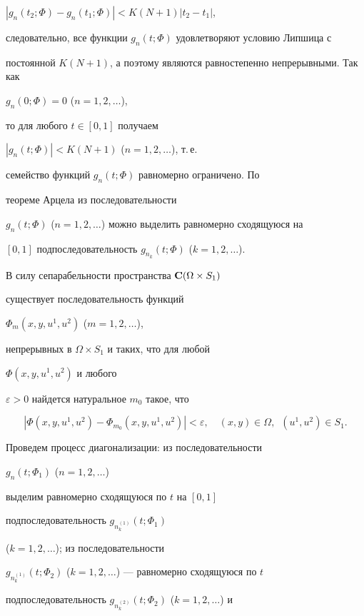 \begin{pf}
$|g_n(t_2;\Phi)-g_n(t_1;\Phi)|<K(N+1)|t_2-t_1|$,


следовательно, все функции $g_n(t;\Phi)$ удовлетворяют условию Липшица с


постоянной $K(N+1)$, а поэтому являются равностепенно непрерывными. Так как


$g_n(0;\Phi)=0$ ($n=1,2,\dotsc$),


то для любого $t\in[0,1]$ получаем


$|g_n(t;\Phi)|<K(N+1)$ ($n=1,2,\dotsc$), т.\,е.


семейство функций $g_n(t;\Phi)$ равномерно ограничено. По


теореме Арцела из последовательности


$g_n(t;\Phi)$ ($n=1,2,\dotsc$) можно выделить равномерно сходящуюся на


$[0,1]$ подпоследовательность $g_{n_k}(t;\Phi)$ ($k=1,2,\dotsc$).





В силу сепарабельности пространства ${\bold{C}}(\Omega \times S_1)$


существует последовательность функций


$\Phi_m(x,y, u^1,u^2)$ ($m=1,2,\dotsc$),


непрерывных в $\Omega \times S_1$ и таких, что для любой


$\Phi(x,y,u^1,u^2)$ и любого


$\varepsilon >0$ найдется натуральное $m_0$ такое, что


\begin{equation}


|\Phi(x,y, u^1,u^2)-\Phi_{m_0}(x,y, u^1,u^2)|< \varepsilon,\quad (x,y)\in


\Omega,\ \; (u^1,u^2) \in S_1.


\end{equation}


Проведем процесс диагонализации: из последовательности


$g_n(t;\Phi_1)$ ($n=1,2,\dotsc$)


выделим равномерно сходящуюся по $t$ на $[0,1]$


подпоследовательность $g_{n_k^{(1)}}(t;\Phi_1)$


($k=1,2,\dotsc$); из последовательности


$g_{n_k^{(1)}}(t;\Phi_2)$ ($k=1,2,\dotsc$) --- равномерно сходящуюся по $t$


подпоследовательность $g_{n_k^{(2)}}(t;\Phi_2)$ ($k=1,2,\dotsc$) и



\end{pf}
